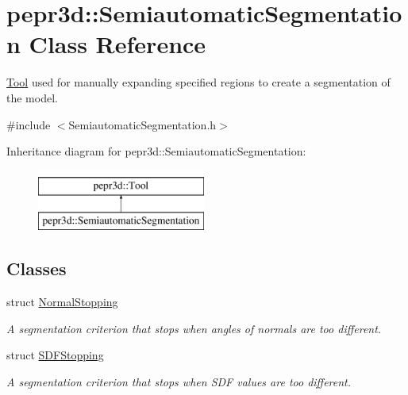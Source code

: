 \hypertarget{classpepr3d_1_1_semiautomatic_segmentation}{}\section{pepr3d\+::Semiautomatic\+Segmentation Class Reference}
\label{classpepr3d_1_1_semiautomatic_segmentation}


\mbox{\hyperlink{classpepr3d_1_1_tool}{Tool}} used for manually expanding specified regions to create a segmentation of the model.  




{\ttfamily \#include $<$Semiautomatic\+Segmentation.\+h$>$}

Inheritance diagram for pepr3d\+::Semiautomatic\+Segmentation\+:\begin{figure}[H]
\begin{center}
\leavevmode
\includegraphics[height=2.000000cm]{classpepr3d_1_1_semiautomatic_segmentation}
\end{center}
\end{figure}
\subsection*{Classes}
\begin{DoxyCompactItemize}
\item 
struct \mbox{\hyperlink{structpepr3d_1_1_semiautomatic_segmentation_1_1_normal_stopping}{Normal\+Stopping}}
\begin{DoxyCompactList}\small\item\em A segmentation criterion that stops when angles of normals are too different. \end{DoxyCompactList}\item 
struct \mbox{\hyperlink{structpepr3d_1_1_semiautomatic_segmentation_1_1_s_d_f_stopping}{S\+D\+F\+Stopping}}
\begin{DoxyCompactList}\small\item\em A segmentation criterion that stops when S\+DF values are too different. \end{DoxyCompactList}\end{DoxyCompactItemize}
